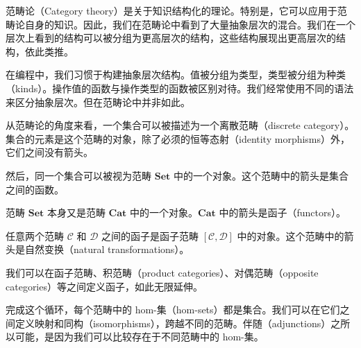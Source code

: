 \documentclass[DaoFP]{subfiles}
\begin{document}
范畴论（Category theory）是关于知识结构化的理论。特别是，它可以应用于范畴论自身的知识。因此，我们在范畴论中看到了大量抽象层次的混合。我们在一个层次上看到的结构可以被分组为更高层次的结构，这些结构展现出更高层次的结构，依此类推。

在编程中，我们习惯于构建抽象层次结构。值被分组为类型，类型被分组为种类（kinds）。操作值的函数与操作类型的函数被区别对待。我们经常使用不同的语法来区分抽象层次。但在范畴论中并非如此。

从范畴论的角度来看，一个集合可以被描述为一个离散范畴（discrete category）。集合的元素是这个范畴的对象，除了必须的恒等态射（identity morphisms）外，它们之间没有箭头。

然后，同一个集合可以被视为范畴 $\mathbf{Set}$ 中的一个对象。这个范畴中的箭头是集合之间的函数。

范畴 $\mathbf{Set}$ 本身又是范畴 $\mathbf{Cat}$ 中的一个对象。$\mathbf{Cat}$ 中的箭头是函子（functors）。

任意两个范畴 $\mathcal{C}$ 和 $\mathcal{D}$ 之间的函子是函子范畴 $[\mathcal{C}, \mathcal{D}]$ 中的对象。这个范畴中的箭头是自然变换（natural transformations）。

我们可以在函子范畴、积范畴（product categories）、对偶范畴（opposite categories）等之间定义函子，如此无限延伸。

完成这个循环，每个范畴中的 hom-集（hom-sets）都是集合。我们可以在它们之间定义映射和同构（isomorphisms），跨越不同的范畴。伴随（adjunctions）之所以可能，是因为我们可以比较存在于不同范畴中的 hom-集。
\end{document}
